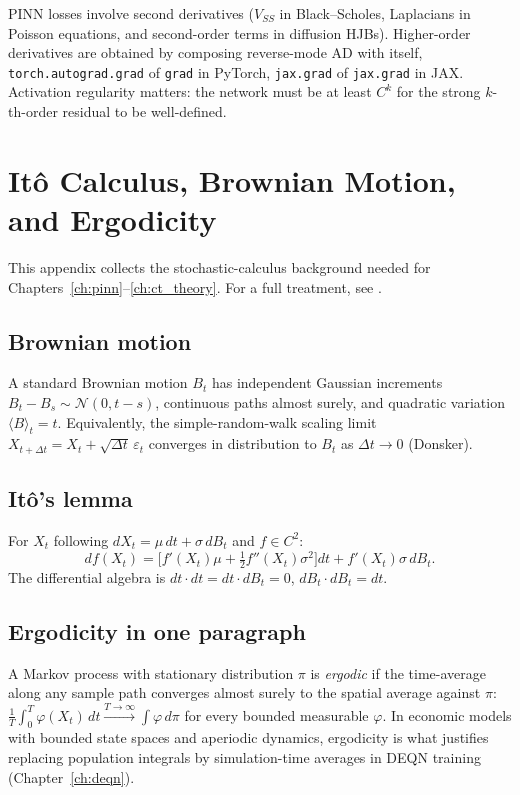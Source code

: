 \documentclass[11pt,a4paper]{report}
\begin{document}
PINN losses involve second derivatives ($V_{SS}$ in Black--Scholes, Laplacians in Poisson equations, and second-order terms in diffusion HJBs).  Higher-order derivatives are obtained by composing reverse-mode AD with itself, \texttt{torch.autograd.grad} of \texttt{grad} in PyTorch, \texttt{jax.grad} of \texttt{jax.grad} in JAX.  Activation regularity matters: the network must be at least $C^k$ for the strong $k$-th-order residual to be well-defined.

\chapter{It\^o Calculus, Brownian Motion, and Ergodicity}
\label{app:stoch}

This appendix collects the stochastic-calculus background needed for Chapters~\ref{ch:pinn}--\ref{ch:ct_theory}.  For a full treatment, see \citet{shreve2004stochasticii}.

\section{Brownian motion}
A standard Brownian motion $B_t$ has independent Gaussian increments $B_t - B_s \sim \mathcal{N}(0, t-s)$, continuous paths almost surely, and quadratic variation $\langle B\rangle_t = t$.  Equivalently, the simple-random-walk scaling limit $X_{t+\Delta t} = X_t + \sqrt{\Delta t}\,\varepsilon_t$ converges in distribution to $B_t$ as $\Delta t \to 0$ (Donsker).

\section{It\^o's lemma}
For $X_t$ following $dX_t = \mu\,dt + \sigma\,dB_t$ and $f \in C^2$:
\[
   df(X_t) = \bigl[f'(X_t)\mu + \tfrac{1}{2}f''(X_t)\sigma^2\bigr]dt + f'(X_t)\sigma\,dB_t.
\]
The differential algebra is $dt\cdot dt = dt\cdot dB_t = 0$, $dB_t \cdot dB_t = dt$.

\section{Ergodicity in one paragraph}
A Markov process with stationary distribution $\pi$ is \emph{ergodic} if the time-average along any sample path converges almost surely to the spatial average against $\pi$:
$\tfrac{1}{T}\int_0^T \varphi(X_t)\,dt \xrightarrow{T\to\infty} \int \varphi\,d\pi$ for every bounded measurable $\varphi$.  In economic models with bounded state spaces and aperiodic dynamics, ergodicity is what justifies replacing population integrals by simulation-time averages in DEQN training (Chapter~\ref{ch:deqn}).
\end{document}
